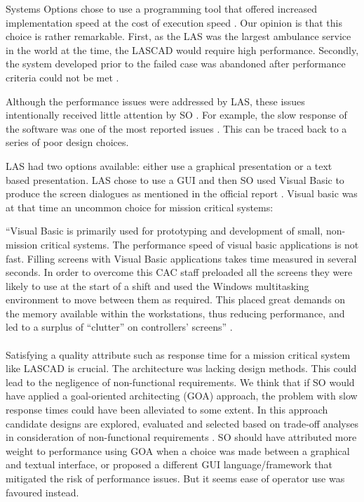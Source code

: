 Systems Options chose to use a programming tool that offered increased implementation speed at the cost of execution speed \autocite[3128]{officialreport}.
Our opinion is that this choice is rather remarkable.
First, as the LAS was the largest ambulance service in the world at the time, the LASCAD would require high performance.
Secondly, the system developed prior to the failed case was abandoned after performance criteria could not be met \autocite[2017]{officialreport}.

Although the performance issues were addressed by LAS, these issues intentionally received little attention by SO \autocite[3128]{officialreport}.
For example, the slow response of the software was one of the most reported issues \autocite[3126]{officialreport}.
This can be traced back to a series of poor design choices.

LAS had two options available: either use a graphical presentation or a text based presentation.
LAS chose to use a GUI and then SO used Visual Basic to produce the screen dialogues as mentioned in the official report \autocite[3128]{officialreport}.
Visual basic was at that time an uncommon choice for mission critical systems: \\

\begin{itshape}
\begin{addmargin}[1em]{1em}
``Visual Basic is primarily used for prototyping and development of small, non-mission critical systems.
The performance speed of visual basic applications is not fast.
Filling screens with Visual Basic applications takes time measured in several seconds.
In order to overcome this CAC staff preloaded all the screens they were likely to use at the start of a shift and used the Windows multitasking environment to move between them as required.
This placed great demands on the memory available within the workstations, thus reducing performance,
and led to a surplus of ``clutter'' on controllers' screens'' \autocite[3128]{officialreport}.
\end{addmargin}
\end{itshape}

\paragraph{}
Satisfying a quality attribute such as response time for a mission critical system like LASCAD is crucial.
The architecture was lacking design methods.
This could lead to the negligence of non-functional requirements.
We think that if SO would have applied a goal-oriented architecting (GOA) approach,
the problem with slow response times could have been alleviated to some extent.
In this approach candidate designs are explored, evaluated and selected based on trade-off analyses in consideration of non-functional requirements \autocite[92]{chung2011goal}.
SO should have attributed more weight to performance using GOA when a choice was made between a graphical and textual interface,
or proposed a different GUI language/framework that mitigated the risk of performance issues.
But it seems ease of operator use was favoured instead.